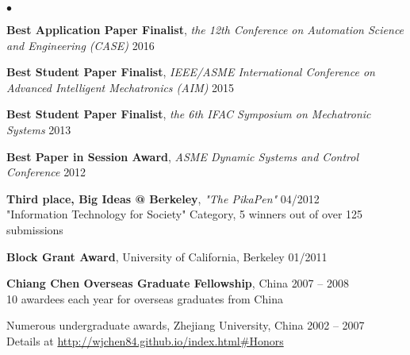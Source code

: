 \documentclass{res}
\begin{document}
\begin{resume}
\begin{list}{$\bullet$}{\setlength\leftmargin{0in}\setlength\topsep{0in}}
\item \textbf{Best Application Paper Finalist}, \emph{the 12th Conference on Automation Science and Engineering (CASE)} \hfill{2016}
\item \textbf{Best Student Paper Finalist}, \emph{IEEE/ASME International Conference on Advanced Intelligent Mechatronics (AIM)} \hfill{2015}
\item \textbf{Best Student Paper Finalist}, \emph{the 6th IFAC Symposium on Mechatronic Systems} \hfill{2013}
\item \textbf{Best Paper in Session Award}, \emph{ASME Dynamic Systems and Control Conference} \hfill{2012}
\item \textbf{Third place, Big Ideas @ Berkeley}, \emph{"The PikaPen"} \hfill{04/2012} \\
"Information Technology for Society" Category, 5 winners out of over 125 submissions
\item \textbf{Block Grant Award}, University of California, Berkeley \hfill{01/2011}
\item \textbf{Chiang Chen Overseas Graduate Fellowship}, China \hfill{2007 -- 2008}\\
10 awardees each year for overseas graduates from China
\item Numerous undergraduate awards, Zhejiang University, China \hfill{2002 -- 2007}\\
Details at \url{http://wjchen84.github.io/index.html#Honors}
\end{list}


\end{resume}
\end{document}
